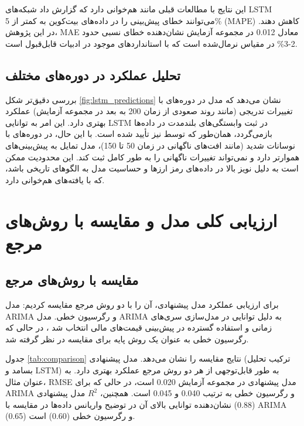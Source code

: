 این نتایج با مطالعات قبلی مانند \cite{hsu2018predicting} هم‌خوانی دارد که گزارش داد شبکه‌های LSTM می‌توانند خطای پیش‌بینی را در داده‌های بیت‌کوین به کمتر از 5\% (MAPE) کاهش دهند. در این پژوهش، MAE معادل 0.012 در مجموعه آزمایش نشان‌دهنده خطای نسبی حدود 2-3\% در مقیاس نرمال‌شده است که با استانداردهای موجود در ادبیات قابل‌قبول است.

\subsection{تحلیل عملکرد در دوره‌های مختلف}
بررسی دقیق‌تر شکل \ref{fig:lstm_predictions} نشان می‌دهد که مدل در دوره‌های با تغییرات تدریجی (مانند روند صعودی از زمان 200 به بعد در مجموعه آزمایش) عملکرد بهتری دارد. این امر به توانایی LSTM در ثبت وابستگی‌های بلندمدت در داده‌ها بازمی‌گردد، همان‌طور که توسط \cite{zhang2021hybrid} نیز تأیید شده است. با این حال، در دوره‌های با نوسانات شدید (مانند افت‌های ناگهانی در زمان 50 تا 150)، مدل تمایل به پیش‌بینی‌های هموارتر دارد و نمی‌تواند تغییرات ناگهانی را به طور کامل ثبت کند. این محدودیت ممکن است به دلیل نویز بالا در داده‌های رمز ارزها و حساسیت مدل به الگوهای تاریخی باشد، که با یافته‌های \cite{wang2021ensemble} هم‌خوانی دارد.

\section{ارزیابی کلی مدل و مقایسه با روش‌های مرجع}
\label{sec:overall_evaluation}

\subsection{مقایسه با روش‌های مرجع}
برای ارزیابی عملکرد مدل پیشنهادی، آن را با دو روش مرجع مقایسه کردیم: مدل ARIMA و رگرسیون خطی. مدل ARIMA به دلیل توانایی در مدل‌سازی سری‌های زمانی و استفاده گسترده در پیش‌بینی قیمت‌های مالی انتخاب شد \cite{box1976time}، در حالی که رگرسیون خطی به عنوان یک روش پایه برای مقایسه در نظر گرفته شد.

جدول \ref{tab:comparison} نتایج مقایسه را نشان می‌دهد. مدل پیشنهادی (ترکیب تحلیل بسامد و LSTM) به طور قابل‌توجهی از هر دو روش مرجع عملکرد بهتری دارد. به عنوان مثال، RMSE مدل پیشنهادی در مجموعه آزمایش 0.020 است، در حالی که برای ARIMA و رگرسیون خطی به ترتیب 0.040 و 0.045 است. همچنین، \(R^2\) مدل پیشنهادی (0.88) نشان‌دهنده توانایی بالای آن در توضیح واریانس داده‌ها در مقایسه با ARIMA (0.65) و رگرسیون خطی (0.60) است.



